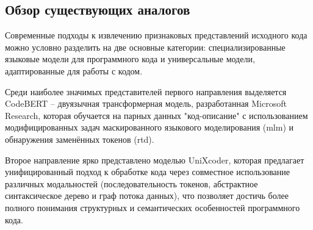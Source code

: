 \documentclass[../part_1.tex]{subfiles}
\begin{document}
\subsection{Обзор существующих аналогов}
\par Современные подходы к извлечению признаковых представлений исходного кода можно условно разделить на две основные категории: специализированные языковые модели для программного кода и универсальные модели, адаптированные для работы с кодом. 
\par Среди наиболее значимых представителей первого направления выделяется CodeBERT\cite{feng2020codebertpretrainedmodelprogramming} -- двуязычная трансформерная модель, разработанная Microsoft Research, которая обучается на парных данных "код-описание" с использованием модифицированных задач маскированного языкового моделирования (\acrshort{mlm}) и обнаружения заменённых токенов (\acrshort{rtd}). 
\par Второе направление ярко представлено моделью UniXcoder\cite{guo2022unixcoder}, которая предлагает унифицированный подход к обработке кода через совместное использование различных модальностей (последовательность токенов, абстрактное синтаксическое дерево и граф потока данных), что позволяет достичь более полного понимания структурных и семантических особенностей программного кода.
\end{document}
